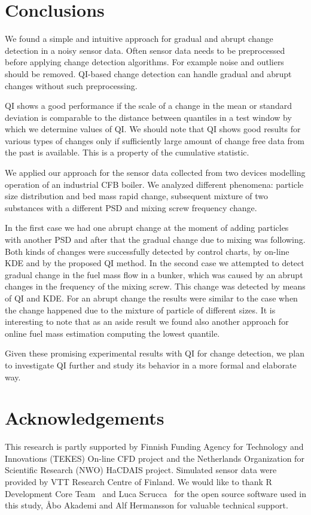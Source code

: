 \section{Conclusions}
\label{sec:conclusion}
We found a simple and intuitive approach for gradual and abrupt change detection in a noisy sensor data. 
Often sensor data needs to be preprocessed before applying change detection algorithms. For example noise and outliers should be removed.
QI-based change detection can handle gradual and abrupt changes without such preprocessing.

QI shows a good performance if the scale of a change in the mean or standard deviation
is comparable to the distance between quantiles in a test window by which we determine values of QI. 
We should note that QI shows good results for various types of changes only if sufficiently large amount of change free data from the past is available.
This is a property of the cumulative statistic.

We applied our approach for the sensor data collected from two devices modelling operation of an industrial CFB boiler. 
We analyzed different phenomena: particle size distribution and bed mass rapid change, subsequent mixture of two substances with a different PSD and mixing screw frequency change.

In the first case we had one abrupt change at the moment of adding particles with another PSD and after that the gradual
change due to mixing was following. Both kinds of changes were successfully detected by control charts, by on-line KDE and by the proposed QI method.
In the second case we attempted to detect gradual change in the fuel mass flow in a bunker, which was caused by an abrupt changes in the frequency of the mixing screw. This change was detected by means of QI and KDE.
For an abrupt change the results were similar to the case when the change happened due to the mixture of particle of different sizes.
It is interesting to note that as an aside result we found also another approach for online fuel mass estimation computing the lowest quantile.

Given these promising experimental results with QI for change detection, we plan to investigate QI further and study its behavior in a more formal and elaborate way.

\section{Acknowledgements}
This research is partly supported by Finnish Funding Agency for Technology and Innovations (TEKES) On-line CFD project and the Netherlands Organization for Scientific Research (NWO) HaCDAIS project.
Simulated sensor data were provided by VTT Research Centre of Finland.
We would like to thank R Development Core Team~\cite{Rref} and Luca Scrucca~\cite{qcc} for the open source software used in this study, \r{A}bo Akademi and Alf Hermansson for valuable technical support.

